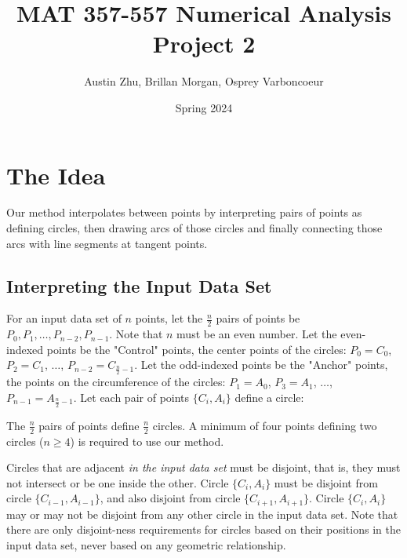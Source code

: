 \documentclass{article}
\title{MAT 357-557 Numerical Analysis Project 2}
\author{Austin Zhu, Brillan Morgan, Osprey Varboncoeur}
\date{Spring 2024}
\begin{document}
\maketitle

\section{The Idea}
Our method interpolates between points by interpreting pairs of points as defining circles, then drawing arcs of those circles and finally connecting those arcs with line segments at tangent points.

\subsection{Interpreting the Input Data Set}
For an input data set of \( n \) points, let the \( \frac{n}{2} \) pairs of points be \( P_0, P_1, \ldots, P_{n-2}, P_{n-1} \). Note that \( n \) must be an even number. Let the even-indexed points be the "Control" points, the center points of the circles: \( P_0 = C_0 \), \( P_2 = C_1 \), \( \ldots \), \( P_{n-2} = C_{\frac{n}{2}-1} \). Let the odd-indexed points be the "Anchor" points, the points on the circumference of the circles: \( P_1 = A_0 \), \( P_3 = A_1 \), \( \ldots \), \( P_{n-1} = A_{\frac{n}{2}-1} \). Let each pair of points \( \{C_i, A_i\} \) define a circle:


\vspace{0.2cm} %

\begin{center}
\end{center}

\vspace{0.2cm} %

The \( \frac{n}{2} \) pairs of points define \( \frac{n}{2} \) circles. A minimum of four points defining two circles (\( n \geq 4 \)) is required to use our method.

Circles that are adjacent \textit{in the input data set} must be disjoint, that is, they must not intersect or be one inside the other. Circle \( \{C_i, A_i\} \) must be disjoint from circle \( \{C_{i-1}, A_{i-1}\} \), and also disjoint from circle \( \{C_{i+1}, A_{i+1}\} \). Circle \( \{C_i, A_i\} \) may or may not be disjoint from any other circle in the input data set. Note that there are only disjoint-ness requirements for circles based on their positions in the input data set, never based on any geometric relationship.
\end{document}
